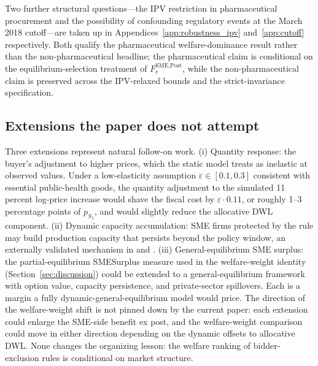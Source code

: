 Two further structural questions---the IPV restriction in pharmaceutical procurement and the possibility of confounding regulatory events at the March 2018 cutoff---are taken up in Appendices~\ref{app:robustness_ipv} and~\ref{app:cutoff} respectively. Both qualify the pharmaceutical welfare-dominance result rather than the non-pharmaceutical headline; the pharmaceutical claim is conditional on the equilibrium-selection treatment of $F_c^{\text{SME,Post}}$, while the non-pharmaceutical claim is preserved across the IPV-relaxed bounds and the strict-invariance specification.

\subsection{Extensions the paper does not attempt}

Three extensions represent natural follow-on work. (i) Quantity response: the buyer's adjustment to higher prices, which the static model treats as inelastic at observed values. Under a low-elasticity assumption $\varepsilon \in [0.1, 0.3]$ consistent with essential public-health goods, the quantity adjustment to the simulated 11 percent log-price increase would shave the fiscal cost by $\varepsilon \cdot 0.11$, or roughly 1--3 percentage points of $p_{S_1}$, and would slightly reduce the allocative DWL component. (ii) Dynamic capacity accumulation: SME firms protected by the rule may build production capacity that persists beyond the policy window, an externally validated mechanism in \citet{ferraz2016} and \citet{szerman2023}. (iii) General-equilibrium SME surplus: the partial-equilibrium SMESurplus measure used in the welfare-weight identity (Section~\ref{sec:discussion}) could be extended to a general-equilibrium framework with option value, capacity persistence, and private-sector spillovers. Each is a margin a fully dynamic-general-equilibrium model would price. The direction of the welfare-weight shift is not pinned down by the current paper: each extension could enlarge the SME-side benefit ex post, and the welfare-weight comparison could move in either direction depending on the dynamic offsets to allocative DWL. None changes the organizing lesson: the welfare ranking of bidder-exclusion rules is conditional on market structure.

